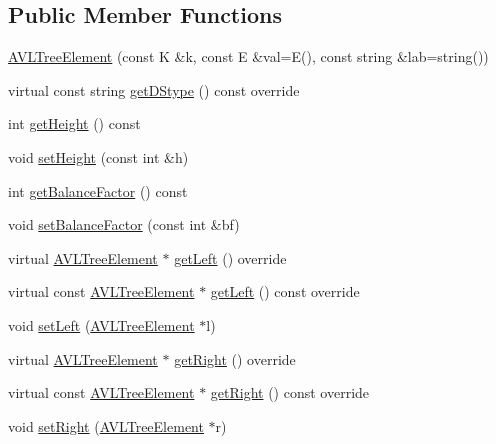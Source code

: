 \subsection*{Public Member Functions}
\begin{DoxyCompactItemize}
\item 
\hyperlink{classbridges_1_1_a_v_l_tree_element_a24d1dfb65f00f2fef96a57a3f869a263}{A\+V\+L\+Tree\+Element} (const K \&k, const E \&val=E(), const string \&lab=string())
\item 
virtual const string \hyperlink{classbridges_1_1_a_v_l_tree_element_a24c005f8e07a7a2682225cead3b7e364}{get\+D\+Stype} () const override
\item 
int \hyperlink{classbridges_1_1_a_v_l_tree_element_ace72b436fa14db4f7844cc6e30b87aa7}{get\+Height} () const
\item 
void \hyperlink{classbridges_1_1_a_v_l_tree_element_acbf2a222b954e5d9221b109634822f96}{set\+Height} (const int \&h)
\item 
int \hyperlink{classbridges_1_1_a_v_l_tree_element_aa37dc257fbc32ad8bfdd885bf98d3a8d}{get\+Balance\+Factor} () const
\item 
void \hyperlink{classbridges_1_1_a_v_l_tree_element_a076ec482874d248764348e62dd4652d2}{set\+Balance\+Factor} (const int \&bf)
\item 
virtual \hyperlink{classbridges_1_1_a_v_l_tree_element}{A\+V\+L\+Tree\+Element} $\ast$ \hyperlink{classbridges_1_1_a_v_l_tree_element_a7b5d05660da127f5f6164120d9846d90}{get\+Left} () override
\item 
virtual const \hyperlink{classbridges_1_1_a_v_l_tree_element}{A\+V\+L\+Tree\+Element} $\ast$ \hyperlink{classbridges_1_1_a_v_l_tree_element_a61e075db5414b7bd6f52d657401acda3}{get\+Left} () const override
\item 
void \hyperlink{classbridges_1_1_a_v_l_tree_element_a19980980e712d10a1158272ecc44ef10}{set\+Left} (\hyperlink{classbridges_1_1_a_v_l_tree_element}{A\+V\+L\+Tree\+Element} $\ast$l)
\item 
virtual \hyperlink{classbridges_1_1_a_v_l_tree_element}{A\+V\+L\+Tree\+Element} $\ast$ \hyperlink{classbridges_1_1_a_v_l_tree_element_a909b46ebf3e8c6a3434762a1f01499e2}{get\+Right} () override
\item 
virtual const \hyperlink{classbridges_1_1_a_v_l_tree_element}{A\+V\+L\+Tree\+Element} $\ast$ \hyperlink{classbridges_1_1_a_v_l_tree_element_a2f6fd127f3a04fcc5be60299b7d98f12}{get\+Right} () const override
\item 
void \hyperlink{classbridges_1_1_a_v_l_tree_element_a2e048abe8e79232effa92dfdbeac4a54}{set\+Right} (\hyperlink{classbridges_1_1_a_v_l_tree_element}{A\+V\+L\+Tree\+Element} $\ast$r)
\end{DoxyCompactItemize}
